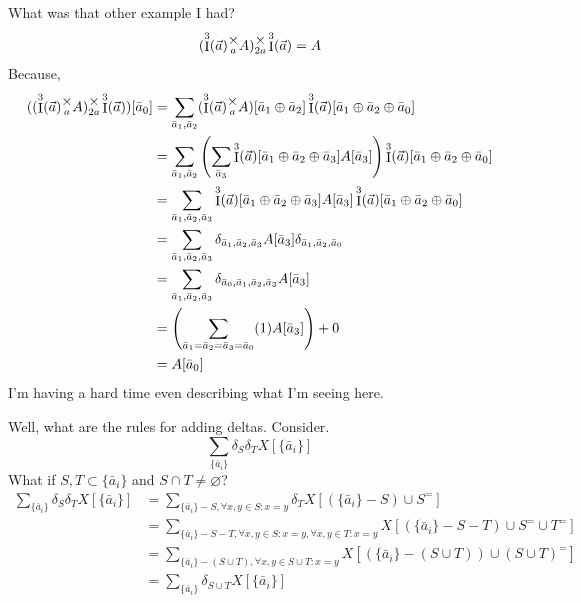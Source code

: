 \documentclass[12pt]{book}
\theoremstyle{plain}
\theoremstyle{definition}
\theoremstyle{ppart}
\theoremstyle{case}
\theoremstyle{solution}
\DeclareMathOperator{\Ident}{I}
\newcommand{\mmult}[1]{\text{\raisebox{1ex}{$\underset{#1}{\times}$}}}
\let\emptyset\varnothing
\begin{document}
\begin{appendices}
\begin{landscape}
What was that other example I had?
\[ (\Ident^3(\vec{a}) \mmult{a} A) \mmult{2a} \Ident^3(\vec{a}) = A \]
Because,
\begin{align*}
  ((\Ident^3(\vec{a}) \mmult{a} A) \mmult{2a} \Ident^3(\vec{a}))[\bar{a}_0]
  &=
  \sum_{\bar{a}_1, \bar{a}_2} 
  (\Ident^3(\vec{a}) \mmult{a} A)[\bar{a}_1 \oplus \bar{a}_2]
  \Ident^3(\vec{a})[\bar{a}_1 \oplus \bar{a}_2 \oplus \bar{a}_0] \\
  &=
  \sum_{\bar{a}_1, \bar{a}_2} 
  \left(
    \sum_{\bar{a}_3}
    \Ident^3(\vec{a})[\bar{a}_1 \oplus \bar{a}_2 \oplus \bar{a}_3]
    A[\bar{a}_3]
  \right)
  \Ident^3(\vec{a})[\bar{a}_1 \oplus \bar{a}_2 \oplus \bar{a}_0] \\
  &=
  \sum_{\bar{a}_1, \bar{a}_2, \bar{a}_3} 
  \Ident^3(\vec{a})[\bar{a}_1 \oplus \bar{a}_2 \oplus \bar{a}_3]
  A[\bar{a}_3]
  \Ident^3(\vec{a})[\bar{a}_1 \oplus \bar{a}_2 \oplus \bar{a}_0] \\
  &=
  \sum_{\bar{a}_1, \bar{a}_2, \bar{a}_3} 
  \delta_{\bar{a}_1, \bar{a}_2, \bar{a}_3}
  A[\bar{a}_3]
  \delta_{\bar{a}_1, \bar{a}_2, \bar{a}_0} \\
  &=
  \sum_{\bar{a}_1, \bar{a}_2, \bar{a}_3} 
  \delta_{\bar{a}_0, \bar{a}_1, \bar{a}_2, \bar{a}_3}
  A[\bar{a}_3] \\
  &=
  \left(
    \sum_{\bar{a}_1=\bar{a}_2=\bar{a}_3=\bar{a}_0} 
    (1)
    A[\bar{a}_3]
  \right)
  +
  0 \\
  &=
  A[\bar{a}_0]
\end{align*}
I'm having a hard time even describing what I'm seeing here.

\pagebreak
Well, what are the rules for adding deltas.
Consider.
\[
  \sum_{\{\bar{a}_i\}} \delta_{S} \delta_{T} X[\{\bar{a}_i\}]
\]
What if $S,T \subset \{\bar{a}_i\}$ and $S \cap T \ne \emptyset$?
\begin{align*}
  \sum_{\{\bar{a}_i\}} \delta_S \delta_T X[\{\bar{a}_i\}]
  &=
  \sum_{\{\bar{a}_i\}-S, \forall x,y \in S : x=y}
  \delta_T X[(\{\bar{a}_i\}-S) \cup S^{=}] \\
  &=
  \sum_{\{\bar{a}_i\}-S-T, \forall x,y \in S : x=y, \forall x,y \in T : x=y}
  X[(\{\bar{a}_i\}-S-T) \cup S^{=} \cup T^{=}] \\
  &=
  \sum_{\{\bar{a}_i\}-(S \cup T), \forall x,y \in S \cup T : x=y}
  X[(\{\bar{a}_i\}-(S \cup T)) \cup (S \cup T)^{=}] \\
  &=
  \sum_{\{\bar{a}_i\}}
  \delta_{S \cup T}
  X[\{\bar{a}_i\}]
\end{align*}

\end{landscape}


\end{appendices}
\end{document}
